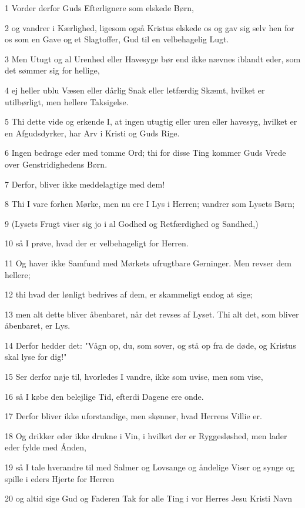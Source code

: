 \par 1 Vorder derfor Guds Efterlignere som elskede Børn,
\par 2 og vandrer i Kærlighed, ligesom også Kristus elskede os og gav sig selv hen for os som en Gave og et Slagtoffer, Gud til en velbehagelig Lugt.
\par 3 Men Utugt og al Urenhed eller Havesyge bør end ikke nævnes iblandt eder, som det sømmer sig for hellige,
\par 4 ej heller ublu Væsen eller dårlig Snak eller letfærdig Skæmt, hvilket er utilbørligt, men hellere Taksigelse.
\par 5 Thi dette vide og erkende I, at ingen utugtig eller uren eller havesyg, hvilket er en Afgudsdyrker, har Arv i Kristi og Guds Rige.
\par 6 Ingen bedrage eder med tomme Ord; thi for disse Ting kommer Guds Vrede over Genstridighedens Børn.
\par 7 Derfor, bliver ikke meddelagtige med dem!
\par 8 Thi I vare forhen Mørke, men nu ere I Lys i Herren; vandrer som Lysets Børn;
\par 9 (Lysets Frugt viser sig jo i al Godhed og Retfærdighed og Sandhed,)
\par 10 så I prøve, hvad der er velbehageligt for Herren.
\par 11 Og haver ikke Samfund med Mørkets ufrugtbare Gerninger. Men revser dem hellere;
\par 12 thi hvad der lønligt bedrives af dem, er skammeligt endog at sige;
\par 13 men alt dette bliver åbenbaret, når det revses af Lyset. Thi alt det, som bliver åbenbaret, er Lys.
\par 14 Derfor hedder det: "Vågn op, du, som sover, og stå op fra de døde, og Kristus skal lyse for dig!"
\par 15 Ser derfor nøje til, hvorledes I vandre, ikke som uvise, men som vise,
\par 16 så I købe den belejlige Tid, efterdi Dagene ere onde.
\par 17 Derfor bliver ikke uforstandige, men skønner, hvad Herrens Villie er.
\par 18 Og drikker eder ikke drukne i Vin, i hvilket der er Ryggesløshed, men lader eder fylde med Ånden,
\par 19 så I tale hverandre til med Salmer og Lovsange og åndelige Viser og synge og spille i eders Hjerte for Herren
\par 20 og altid sige Gud og Faderen Tak for alle Ting i vor Herres Jesu Kristi Navn
